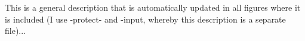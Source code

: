 This is a general description that is automatically updated in all figures where it is included (I use -protect- and -input, whereby this description is a separate file)...